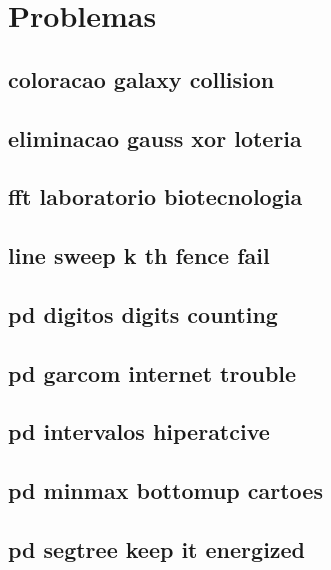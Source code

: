 \section{Problemas}
\subsection{coloracao galaxy collision}
\raggedbottom
\hrulefill
\subsection{eliminacao gauss xor loteria}
\raggedbottom
\hrulefill
\subsection{fft laboratorio biotecnologia}
\raggedbottom
\hrulefill
\subsection{line sweep k th fence fail}
\raggedbottom
\hrulefill
\subsection{pd digitos digits counting}
\raggedbottom
\hrulefill
\subsection{pd garcom internet trouble}
\raggedbottom
\hrulefill
\subsection{pd intervalos hiperatcive}
\raggedbottom
\hrulefill
\subsection{pd minmax bottomup cartoes}
\raggedbottom
\hrulefill
\subsection{pd segtree keep it energized}
\raggedbottom
\hrulefill

